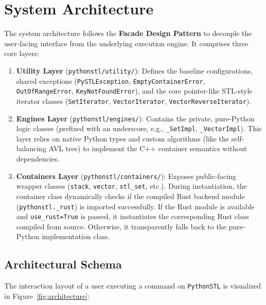 \documentclass[11pt,a4paper]{article}
\begin{document}
\newpage

\section{System Architecture}

The system architecture follows the \textbf{Facade Design Pattern} to decouple the user-facing interface from the underlying execution engine. It comprises three core layers:

\begin{enumerate}
    \item \textbf{Utility Layer} (\texttt{pythonstl/utility/}):
    Defines the baseline configurations, shared exceptions (\texttt{PySTLException}, \texttt{EmptyContainerError}, \texttt{OutOfRangeError}, \texttt{KeyNotFoundError}), and the core pointer-like STL-style iterator classes (\texttt{SetIterator}, \texttt{VectorIterator}, \texttt{VectorReverseIterator}).
    
    \item \textbf{Engines Layer} (\texttt{pythonstl/engines/}):
    Contains the private, pure-Python logic classes (prefixed with an underscore, e.g., \texttt{\_SetImpl}, \texttt{\_VectorImpl}). This layer relies on native Python types and custom algorithms (like the self-balancing AVL tree) to implement the C++ container semantics without dependencies.
    
    \item \textbf{Containers Layer} (\texttt{pythonstl/containers/}):
    Exposes public-facing wrapper classes (\texttt{stack}, \texttt{vector}, \texttt{stl\_set}, etc.). During instantiation, the container class dynamically checks if the compiled Rust backend module (\texttt{pythonstl.\_rust}) is imported successfully. If the Rust module is available and \texttt{use\_rust=True} is passed, it instantiates the corresponding Rust class compiled from source. Otherwise, it transparently falls back to the pure-Python implementation class.
\end{enumerate}

\subsection{Architectural Schema}
The interaction layout of a user executing a command on \texttt{PythonSTL} is visualized in Figure~\ref{fig:architecture}:
\end{document}
